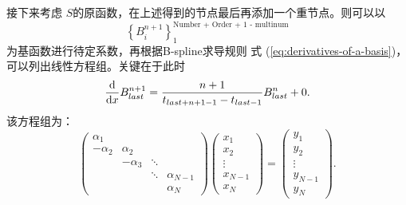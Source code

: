 接下来考虑 $S$的原函数，在上述得到的节点最后再添加一个重节点。则可以以
\[
  \left\{ B_i^{n+1} \right\}_{1}^{\text{Number + Order + 1 - multinum}}
\]
为基函数进行待定系数，再根据B-spline求导规则 式 (\ref{eq:derivatives-of-a-basis})，可以列出线性方程组。关键在于此时
\[
  \frac{\mathrm{d} }{\mathrm{d} x} B_{last}^{n+1} = \frac{n+1}{t_{last + n + 1 - 1 } - t_{last -1}} B_{last}^{n} + 0.
\]
该方程组为：
\[
  \begin{pmatrix} 
    \alpha_{1}   &  &  &  \\
    -\alpha_{2}  & \alpha_{2} &  &  \\
             & -\alpha_{3} & \ddots &  \\
             &  & \ddots & \alpha_{N-1} \\
             &  &  & \alpha_{N}
  \end{pmatrix}
  \begin{pmatrix} 
    x_{1} \\
    x_{2} \\
    \vdots \\
    x_{N-1} \\
    x_{N}
  \end{pmatrix}
  =
  \begin{pmatrix} 
    y_{1} \\
    y_{2} \\
    \vdots \\
    y_{N-1} \\
    y_{N}
  \end{pmatrix}.
\]

